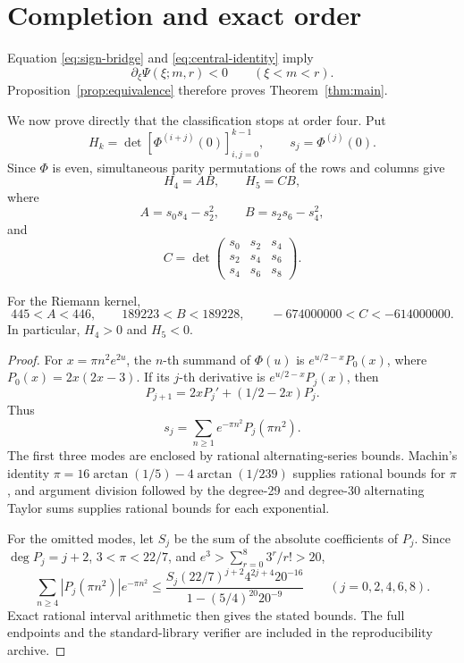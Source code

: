 \section{Completion and exact order}\label{sec:completion}

Equation \eqref{eq:sign-bridge} and \eqref{eq:central-identity} imply
\[
 \partial_\xi\Psi(\xi;m,r)<0\qquad(\xi<m<r).
\]
Proposition~\ref{prop:equivalence} therefore proves
Theorem~\ref{thm:main}.

We now prove directly that the classification stops at order four. Put
\[
 H_k=\det[\Phi^{(i+j)}(0)]_{i,j=0}^{k-1},\qquad
 s_j=\Phi^{(j)}(0).
\]
Since \(\Phi\) is even, simultaneous parity permutations of the rows and
columns give
\[
 H_4=AB,\qquad H_5=CB,
\]
where
\[
 A=s_0s_4-s_2^2,\qquad B=s_2s_6-s_4^2,
\]
and
\[
 C=\det\begin{pmatrix}
 s_0&s_2&s_4\\
 s_2&s_4&s_6\\
 s_4&s_6&s_8
 \end{pmatrix}.
\]

\begin{lemma}\label{lem:origin-pf5-sign}
For the Riemann kernel,
\[
 445<A<446,\qquad 189223<B<189228,
 \qquad -674000000<C<-614000000.
\]
In particular, \(H_4>0\) and \(H_5<0\).
\end{lemma}

\begin{proof}
For \(x=\pi n^2e^{2u}\), the \(n\)-th summand of \(\Phi(u)\) is
\(e^{u/2-x}P_0(x)\), where \(P_0(x)=2x(2x-3)\). If its \(j\)-th derivative
is \(e^{u/2-x}P_j(x)\), then
\[
 P_{j+1}=2xP_j'+(1/2-2x)P_j.
\]
Thus
\[
 s_j=\sum_{n\ge1}e^{-\pi n^2}P_j(\pi n^2).
\]
The first three modes are enclosed by rational alternating-series bounds.
Machin's identity
\(\pi=16\arctan(1/5)-4\arctan(1/239)\) supplies rational bounds for \(\pi\),
and argument division followed by the degree-29 and degree-30 alternating
Taylor sums supplies rational bounds for each exponential.

For the omitted modes, let \(S_j\) be the sum of the absolute coefficients of
\(P_j\). Since \(\deg P_j=j+2\), \(3<\pi<22/7\), and
\(e^3>\sum_{r=0}^8 3^r/r!>20\),
\[
 \sum_{n\ge4}|P_j(\pi n^2)|e^{-\pi n^2}
 \leq
 \frac{S_j(22/7)^{j+2}4^{2j+4}20^{-16}}
 {1-(5/4)^{20}20^{-9}}
 \qquad(j=0,2,4,6,8).
\]
Exact rational interval arithmetic then gives the stated bounds. The full
endpoints and the standard-library verifier are included in the
reproducibility archive.
\end{proof}

